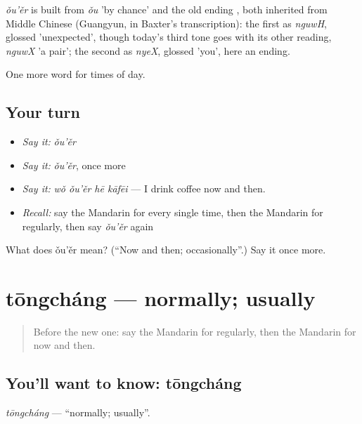 \begin{cousinweb}
\emph{ǒu'ěr} is built from \emph{ǒu} 'by chance' and the old ending , both inherited from Middle Chinese (Guangyun, in Baxter's transcription): the first as \emph{nguwH}, glossed 'unexpected', though today's third tone goes with its other reading, \emph{nguwX} 'a pair'; the second as \emph{nyeX}, glossed 'you', here an ending.
\end{cousinweb}

\begin{grammarlens}[title={What you've built}]
One more word for times of day.
\end{grammarlens}

\subsection*{Your turn}
\begin{itemize}
\raggedright
  \item \emph{Say it:} \emph{ǒu'ěr}
  \item \emph{Say it:} \emph{ǒu'ěr}, once more
  \item \emph{Say it:} \emph{wǒ ǒu'ěr hē kāfēi} — I drink coffee now and then.
  \item \emph{Recall:} say the Mandarin for every single time, then the Mandarin for regularly, then say \emph{ǒu'ěr} again
\end{itemize}

\begin{tcolorbox}[breakable,colback=teal!4,colframe=teal!35!black,title={Before you move on}]
What does ǒu'ěr mean? (\textquotedblleft{}Now and then; occasionally\textquotedblright{}.) Say it once more.
\end{tcolorbox}
\section[tōngcháng]{tōngcháng — normally; usually}

\label{lesson:ZH-C162-tongchang}



\begin{quote}
Before the new one: say the Mandarin for regularly, then the Mandarin for now and then.
\end{quote}

\subsection*{You'll want to know: tōngcháng}
\emph{tōngcháng} — \textquotedblleft{}normally; usually\textquotedblright{}.

